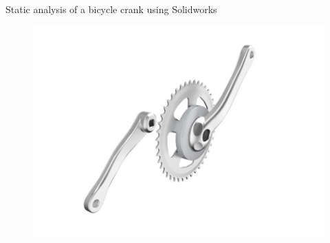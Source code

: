 \documentclass[
10pt,
a4paper,
openany,
svgnames,
]{book}
\begin{document}
\begin{example} Static analysis of a bicycle crank using Solidworks
  
  \begin{figure}[H]
    \centering
    \includegraphics[scale=0.4]{pictures/Intro-CAD/bike-crank-set}
  \end{figure}
\end{example}
\end{document}
